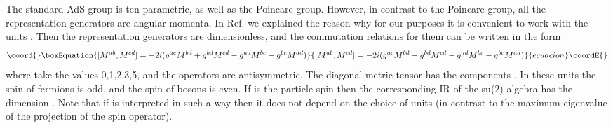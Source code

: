 \documentclass[a4paper,12pt]{article}%
\begin{document}
The standard AdS group
is ten-parametric, as well as the Poincare group. However, 
in contrast to the Poincare group, all the representation 
generators are angular momenta. In Ref. \cite{lev2} we 
explained the reason why for our
purposes it is convenient to work with the units 
\coordHE{}. Then the representation generators are
dimensionless, and the commutation relations for them can be 
written in the form
\begin{equation}\coord{}\boxEquation{
[M^{ab},M^{cd}]=-2i (g^{ac}M^{bd}+g^{bd}M^{cd}-
g^{ad}M^{bc}-g^{bc}M^{ad})
\label{8}
}{
[M^{ab},M^{cd}]=-2i (g^{ac}M^{bd}+g^{bd}M^{cd}-
g^{ad}M^{bc}-g^{bc}M^{ad})
}{ecuacion}\coordE{}\end{equation}
where \coordHE{} take the values 0,1,2,3,5, and the operators 
\coordHE{} are antisymmetric. The diagonal metric tensor has the 
components \coordHE{}.  
In these units the spin of fermions is odd, and the spin of 
bosons is even. If \coordHE{} is the particle spin then the 
corresponding IR of the su(2) algebra has the dimension
\coordHE{}. Note that if \coordHE{} is interpreted in such a way then it
does not depend on the choice of units (in contrast to the
maximum eigenvalue of the \coordHE{} projection of the spin
operator).    
\end{document}
